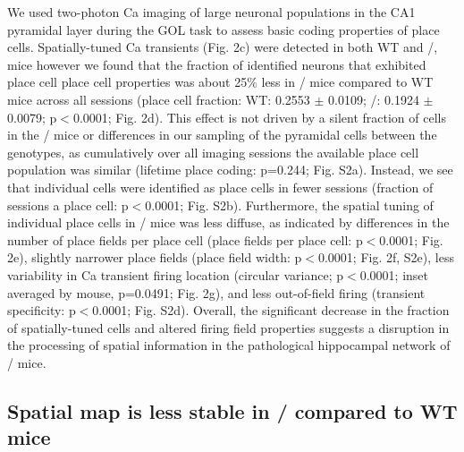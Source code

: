 We used two-photon Ca imaging of large neuronal populations in the CA1 pyramidal layer during the GOL task to assess basic coding properties of place cells. Spatially-tuned Ca transients \citep{Dombeck2007} (Fig. 2c) were detected in both WT and \df/, mice however we found that the fraction of identified neurons that exhibited place cell place cell properties was about 25$\%$ less in \df/ mice compared to WT mice across all sessions (place cell fraction: WT: 0.2553 $\pm$ 0.0109; \df/: 0.1924 $\pm$ 0.0079; p$<$0.0001; Fig. 2d).  This effect is not driven by a silent fraction of cells in the \df/ mice or differences in our sampling of the pyramidal cells between the genotypes, as cumulatively over all imaging sessions the available place cell population was similar (lifetime place coding: p=0.244; Fig. S2a). Instead, we see that individual cells were identified as place cells in fewer sessions (fraction of sessions a place cell: p$<$0.0001; Fig. S2b). Furthermore, the spatial tuning of individual place cells in \df/ mice was less diffuse, as indicated by differences in the number of place fields per place cell (place fields per place cell: p$<$0.0001; Fig. 2e), slightly narrower place fields (place field width: p$<$0.0001; Fig. 2f, S2e), less variability in Ca transient firing location (circular variance; p$<$0.0001; inset averaged by mouse, p=0.0491; Fig. 2g), and less out-of-field firing (transient specificity: p$<$0.0001; Fig. S2d).  Overall, the significant decrease in the fraction of spatially-tuned cells and altered firing field properties suggests a disruption in the processing of spatial information in the pathological hippocampal network of \df/ mice.

\subsection{Spatial map is less stable in \df/ compared to WT mice}

